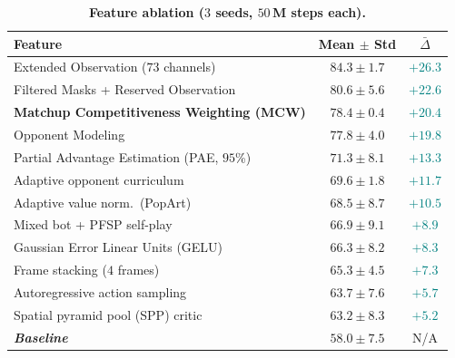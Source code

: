 \documentclass[conference]{IEEEtran}
\begin{document}
\begin{table}[!tb]
\centering
\caption{\textbf{Feature ablation ($3$ seeds, $50$\,M steps each).}}
\label{tab:feat-ablation-summary}
\footnotesize
\setlength{\tabcolsep}{4pt}
\begin{tabularx}{\linewidth}{@{}>{\raggedright\arraybackslash}X | c c@{}}
  \toprule
  \textbf{Feature} & \textbf{Mean $\pm$ Std} & \textbf{$\bar{\Delta}$} \\
  \midrule
  Extended Observation ($73$ channels)~\cite{goodfriendCompetitionWinningDeep2024}    & $84.3 \pm 1.7$ & \textcolor{teal}{$+26.3$} \\
  Filtered Masks + Reserved Observation~\cite{goodfriendCompetitionWinningDeep2024}   & $80.6 \pm 5.6$ & \textcolor{teal}{$+22.6$} \\
  \textbf{Matchup Competitiveness Weighting (MCW)} & $78.4 \pm 0.4$ & \textcolor{teal}{$+20.4$} \\
  Opponent Modeling~\cite{manandharReinforcementActorcriticLearning2024} & $77.8 \pm 4.0$ & \textcolor{teal}{$+19.8$} \\
  \midrule
  Partial Advantage Estimation (PAE, $95$\%)~\cite{jinPartialAdvantageEstimator2025}  & $71.3 \pm 8.1$ & \textcolor{teal}{$+13.3$} \\
  Adaptive opponent curriculum & $69.6 \pm 1.8$ & \textcolor{teal}{$+11.7$} \\
  Adaptive value norm.\ (PopArt)~\cite{vanhasseltLearningValuesMany2016} & $68.5 \pm 8.7$ & \textcolor{teal}{$+10.5$} \\
  Mixed bot + PFSP self-play~\cite{vinyalsGrandmasterLevelStarCraft2019} & $66.9 \pm 9.1$ & \textcolor{teal}{$+8.9$} \\
  Gaussian Error Linear Units (GELU)~\cite{hendrycksGaussianErrorLinear2016}          & $66.3 \pm 8.2$ & \textcolor{teal}{$+8.3$} \\
  Frame stacking ($4$ frames)~\cite{mnihHumanlevelControlDeep2015} & $65.3 \pm 4.5$ & \textcolor{teal}{$+7.3$} \\
  Autoregressive action sampling~\cite{vinyalsGrandmasterLevelStarCraft2019}          & $63.7 \pm 7.6$ & \textcolor{teal}{$+5.7$} \\
  Spatial pyramid pool (SPP) critic~\cite{heSpatialPyramidPooling2015} & $63.2 \pm 8.3$ & \textcolor{teal}{$+5.2$} \\
  \midrule
  \textbf{\textit{Baseline}} & $58.0 \pm 7.5$ & N/A \\
  \bottomrule
  \end{tabularx}
\end{table}
\end{document}
